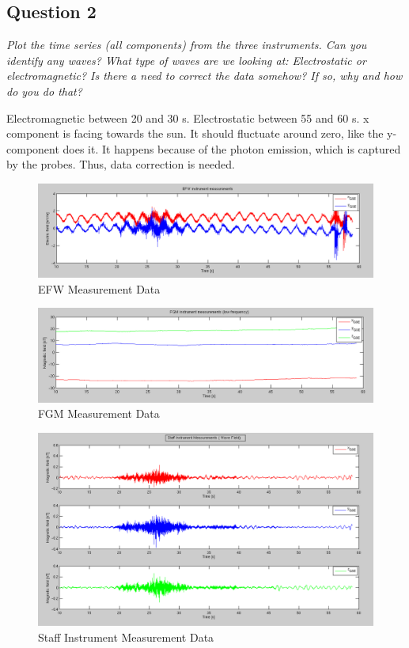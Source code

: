 \documentclass{article}
\begin{document}
\subsection{Question 2}
\textit{Plot the time series (all components) from the three instruments. Can you identify any waves? What type of waves are we looking at: Electrostatic or electromagnetic? Is there a need to correct the data somehow? If so, why and how do you do that?}

Electromagnetic between 20 and 30 s. Electrostatic between 55 and 60 s. x component is facing towards the sun. It should fluctuate around zero, like the y-component does it. It happens because of the photon emission, which is captured by the probes. Thus, data correction is needed.

\begin{figure}[htb!]
\centering
\includegraphics[width=\textwidth]{Figures/EFW_measurement.png}
\caption{EFW Measurement Data}
\label{fig:EFW}
\end{figure}

\begin{figure}[htb!]
\centering
\includegraphics[width=\textwidth]{Figures/FGM_measurement.png}
\caption{FGM Measurement Data}
\label{fig:FGM}
\end{figure}

\begin{figure}[htb!]
\centering
\includegraphics[width=\textwidth]{Figures/Staff_measurement.png}
\caption{Staff Instrument Measurement Data}
\label{fig:Staff}
\end{figure}
\end{document}
